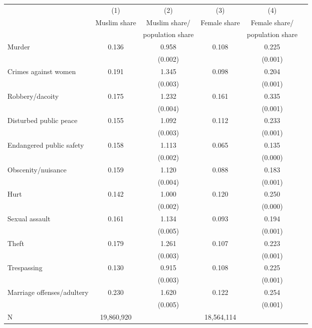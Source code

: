 {
\def\sym#1{\ifmmode^{#1}\else\(^{#1}\)\fi}
\begin{tabular}{l*{5}{c}}
  \hline\hline
&\multicolumn{1}{c}{(1)}&\multicolumn{1}{c}{(2)}&\multicolumn{1}{c}{(3)}&\multicolumn{1}{c}{(4)}\\
&\multicolumn{1}{c}{Muslim share}&{Muslim share/}&{Female share}&{Female share/}\\
&\multicolumn{1}{c}{}&\multicolumn{1}{c}{population share}&\multicolumn{1}{c}{}&\multicolumn{1}{c}{population share}\\
\hline
Murder & 0.136 & 0.958 & 0.108 & 0.225\\
& & (0.002) & & (0.001)\\
Crimes against women& 0.191 & 1.345  & 0.098 & 0.204& \\
& & (0.003) & & (0.001)\\
Robbery/dacoity& 0.175 & 1.232 & 0.161 & 0.335\\
& & (0.004) & & (0.001)\\
Disturbed public peace& 0.155 & 1.092 & 0.112 & 0.233\\
& & (0.003) & & (0.001)\\
Endangered public safety& 0.158 & 1.113 & 0.065 & 0.135\\
& & (0.002) & & (0.000)\\
Obscenity/nuisance & 0.159 & 1.120 & 0.088 & 0.183\\
& & (0.004) & & (0.001)\\
Hurt & 0.142 & 1.000 & 0.120 & 0.250\\
& & (0.002) & & (0.000)\\
Sexual assault & 0.161 & 1.134 & 0.093 & 0.194\\
& & (0.005) & & (0.001)\\
Theft & 0.179 & 1.261  & 0.107 & 0.223\\
& & (0.003) & & (0.001)\\
Trespassing & 0.130 & 0.915 & 0.108 & 0.225\\
& & (0.003) & & (0.001)\\
Marriage offenses/adultery & 0.230 & 1.620  & 0.122 & 0.254\\
& & (0.005) & & (0.001)\\
\hline
N  &   19,860,920      &  &  18,564,114   &   \\
\hline\hline
\end{tabular}
}
